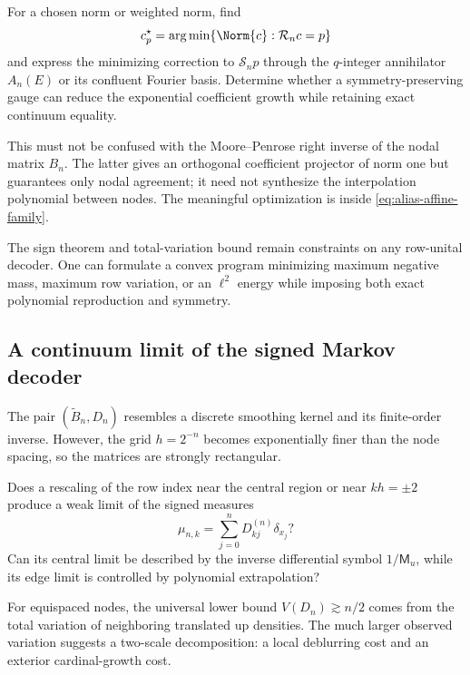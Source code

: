 \documentclass[11pt,oneside]{article}
\numberwithin{equation}{section}
\theoremstyle{definition}
\theoremstyle{remark}
\newcommand{\MGF}{\mathsf M}
\newcommand{\Synth}{\mathcal R}
\newcommand{\Coeff}{\mathcal S}
\begin{document}
\begin{problem}
\label{prob:optimal-gauge}
For a chosen norm or weighted norm, find
\begin{equation}
 c_p^\star=\arg\min\{\Norm{c}:\Synth_nc=p\}
 \label{eq:min-gauge}
\end{equation}
and express the minimizing correction to $\Coeff_np$ through the
$q$-integer annihilator $A_n(E)$ or its confluent Fourier basis.  Determine
whether a symmetry-preserving gauge can reduce the exponential coefficient
growth while retaining exact continuum equality.
\end{problem}

This must not be confused with the Moore--Penrose right inverse of the nodal
matrix $B_n$.  The latter gives an orthogonal coefficient projector of norm
one but guarantees only nodal agreement; it need not synthesize the
interpolation polynomial between nodes.  The meaningful optimization is
inside \eqref{eq:alias-affine-family}.

The sign theorem and total-variation bound remain constraints on any
row-unital decoder.  One can formulate a convex program minimizing maximum
negative mass, maximum row variation, or an $\ell^2$ energy while imposing
both exact polynomial reproduction and symmetry.

\subsection{A continuum limit of the signed Markov decoder}

The pair $(\widetilde B_n,D_n)$ resembles a discrete smoothing kernel and its
finite-order inverse.  However, the grid $h=2^{-n}$ becomes exponentially
finer than the node spacing, so the matrices are strongly rectangular.

\begin{question}
Does a rescaling of the row index near the central region or near
$kh=\pm2$ produce a weak limit of the signed measures
\begin{equation}
 \mu_{n,k}=\sum_{j=0}^{n}D_{kj}^{(n)}\delta_{x_j}?
 \label{eq:decoder-measure}
\end{equation}
Can its central limit be described by the inverse differential symbol
$1/\MGF_u$, while its edge limit is controlled by polynomial extrapolation?
\end{question}

For equispaced nodes, the universal lower bound
$V(D_n)\gtrsim n/2$ comes from the total variation of neighboring translated
up densities.  The much larger observed variation suggests a two-scale
decomposition: a local deblurring cost and an exterior cardinal-growth cost.
\end{document}
